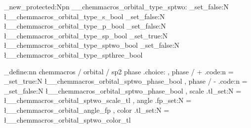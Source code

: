 \cs_new_protected:Npn \__chemmacros_orbital_type_sptwo:
  {
    \bool_set_false:N \l__chemmacros_orbital_type_s_bool
    \bool_set_false:N \l__chemmacros_orbital_type_p_bool
    \bool_set_false:N \l__chemmacros_orbital_type_sp_bool
    \bool_set_true:N  \l__chemmacros_orbital_type_sptwo_bool
    \bool_set_false:N \l__chemmacros_orbital_type_spthree_bool
  }

\keys_define:nn { chemmacros / orbital / sp2 }
  {
    phase .choice: ,
    phase / + .code:n =
      { \bool_set_true:N \l__chemmacros_orbital_sptwo_phase_bool } ,
    phase / - .code:n =
      { \bool_set_false:N \l__chemmacros_orbital_sptwo_phase_bool } ,
    scale .tl_set:N   = \l__chemmacros_orbital_sptwo_scale_tl ,
    angle .fp_set:N   = \l__chemmacros_orbital_angle_fp ,
    color .tl_set:N   = \l__chemmacros_orbital_sptwo_color_tl
  }

